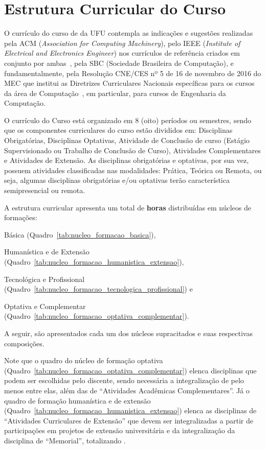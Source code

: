\chapter{Estrutura Curricular do Curso}

O currículo do curso de \nomecursonovo da UFU contempla as indicações e sugestões realizadas pela ACM (\textit{Association for Computing Machinery}), pelo IEEE (\textit{Institute of Electrical and Electronics Engineer}) nos currículos de referência criados em conjunto por ambas~\cite{ACM:CC2020}, pela SBC (Sociedade Brasileira de Computação), e fundamentalmente, pela Resolução CNE/CES nº 5 de 16 de novembro de 2016 do MEC que institui as Diretrizes Curriculares Nacionais específicas para os cursos da área de Computação~\cite{MEC:CNE:CES:5:2016}, em particular, para cursos de Engenharia da Computação.

O currículo do Curso está organizado em 8 (oito) períodos ou semestres, sendo que os componentes curriculares do curso estão divididos em: Disciplinas Obrigatórias, Disciplinas Optativas, Atividade de Conclusão de curso (Estágio Supervisionado ou Trabalho de Conclusão de Curso), Atividades Complementares e Atividades de Extensão. As disciplinas obrigatórias e optativas, por sua vez, possuem atividades classificadas nas modalidades: Prática, Teórica ou Remota, ou seja, algumas disciplinas obrigatórias e/ou optativas terão característica semipresencial ou remota.

A estrutura curricular apresenta um total de \textbf{horas} distribuídas em núcleos de formações: \begin{enumerate*}[label=\roman*.] \item Básica (Quadro~\ref{tab:nucleo_formacao_basica}), \item Humanística e de Extensão (Quadro~\ref{tab:nucleo_formacao_humanistica_extensao}), \item Tecnológica e Profissional (Quadro~\ref{tab:nucleo_formacao_tecnologica_profissional}) e \item Optativa e Complementar (Quadro~\ref{tab:nucleo_formacao_optativa_complementar}). \end{enumerate*}

A seguir, são apresentados cada um dos núcleos supracitados e suas respectivas composições. 

Note que o quadro do núcleo de formação optativa (Quadro~\ref{tab:nucleo_formacao_optativa_complementar}) elenca disciplinas que podem ser escolhidas pelo discente, sendo necessária a integralização de pelo menos entre elas, além das de ``Atividades Acadêmicas Complementares''. Já o quadro de formação humanística e de extensão (Quadro~\ref{tab:nucleo_formacao_humanistica_extensao}) elenca as disciplinas de ``Atividades Curriculares de Extensão'' que devem ser integralizadas a partir de participações em projetos de extensão universitária e da integralização da disciplina de ``Memorial'', totalizando \unskip.


